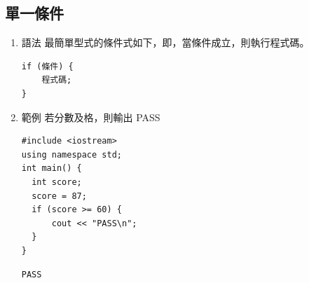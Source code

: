 \documentclass[a4paper,12pt]{article}
\begin{document}
\subsection{單一條件}
\label{sec:org195ae2c}
\begin{enumerate}
\item 語法
\label{sec:org042cc73}
最簡單型式的條件式如下，即，當條件成立，則執行程式碼。\\
\lstset{breaklines=true,language=cpp,label= ,caption= ,captionpos=b,numbers=none}
\begin{lstlisting}
if (條件) {
    程式碼;
}
\end{lstlisting}

\item 範例
\label{sec:org6faba50}
若分數及格，則輸出 PASS\\
\lstset{breaklines=true,language=cpp,label= ,caption= ,captionpos=b,firstnumber=1,numbers=left}
\begin{lstlisting}
#include <iostream>
using namespace std;
int main() {
  int score;
  score = 87;
  if (score >= 60) {
      cout << "PASS\n";
  }
}
\end{lstlisting}

\begin{verbatim}
PASS
\end{verbatim}


\end{enumerate}
\end{document}
